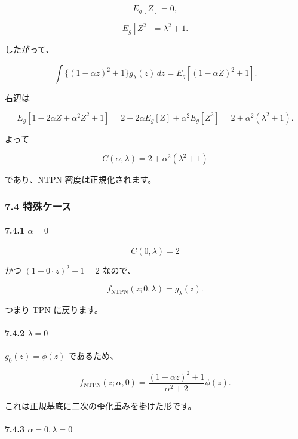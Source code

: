 \documentclass[
]{article}
\begin{document}
\[
E_g[Z]=0,
\]

\[
E_g[Z^2]=\lambda^2+1.
\]

したがって、

\[
\int\{(1-\alpha z)^2+1\}g_\lambda(z)\,dz
=E_g[(1-\alpha Z)^2+1].
\]

右辺は

\[
E_g[1-2\alpha Z+\alpha^2Z^2+1]
=2-2\alpha E_g[Z]+\alpha^2E_g[Z^2]
=2+\alpha^2(\lambda^2+1).
\]

よって

\[
C(\alpha,\lambda)=2+\alpha^2(\lambda^2+1)
\]

であり、NTPN 密度は正規化されます。

\hypertarget{ux7279ux6b8aux30b1ux30fcux30b9-2}{%
\subsubsection{7.4 特殊ケース}\label{ux7279ux6b8aux30b1ux30fcux30b9-2}}

\hypertarget{alpha0-1}{%
\paragraph{\texorpdfstring{7.4.1
\(\alpha=0\)}{7.4.1 \textbackslash alpha=0}}\label{alpha0-1}}

\[
C(0,\lambda)=2
\]

かつ \((1-0\cdot z)^2+1=2\) なので、

\[
f_{\mathrm{NTPN}}(z;0,\lambda)=g_\lambda(z).
\]

つまり TPN に戻ります。

\hypertarget{lambda0}{%
\paragraph{\texorpdfstring{7.4.2
\(\lambda=0\)}{7.4.2 \textbackslash lambda=0}}\label{lambda0}}

\(g_0(z)=\phi(z)\) であるため、

\[
f_{\mathrm{NTPN}}(z;\alpha,0)
=\frac{(1-\alpha z)^2+1}{\alpha^2+2}\phi(z).
\]

これは正規基底に二次の歪化重みを掛けた形です。

\hypertarget{alpha0lambda0}{%
\paragraph{\texorpdfstring{7.4.3
\(\alpha=0,\lambda=0\)}{7.4.3 \textbackslash alpha=0,\textbackslash lambda=0}}\label{alpha0lambda0}}
\end{document}
